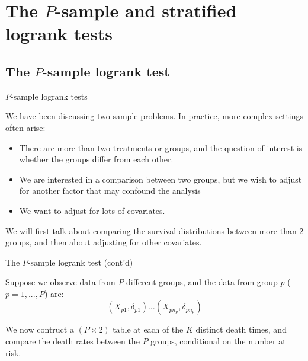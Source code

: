 \documentclass[envcountsect, 10pt, portrait, palatino]{beamer}
\begin{document}
\section{The $P$-sample and stratified  logrank tests}
\subsection{The $P$-sample logrank test}
\begin{frame}{$P$-sample logrank tests}

We have been discussing two sample problems.  In practice,
more complex settings often arise:
\begin{itemize}
\item There are more than two treatments or groups, and the question of
 interest is whether the groups differ from each other.
\item We are interested in a comparison between  two groups, but we
wish to adjust for another factor that may confound  the analysis
\item We want to adjust for lots of covariates.
\end{itemize}

We will first talk about comparing the survival distributions
between more than 2 groups, and then about adjusting for other
covariates.
\end{frame}
\begin{frame}{The $P$-sample logrank test (cont'd)}

Suppose we observe data from $P$ different groups, and
 the data from group $p$ ($p=1,...,P$) are:
\[ (X_{p1},\delta_{p1}) \dots
(X_{p n_p},\delta_{p n_p}) \]

We now contruct a $(P \times 2)$ table at each of
the $K$ distinct death times, and compare the death rates
between the $P$ groups, conditional on the number at risk.
\end{frame}
\end{document}
